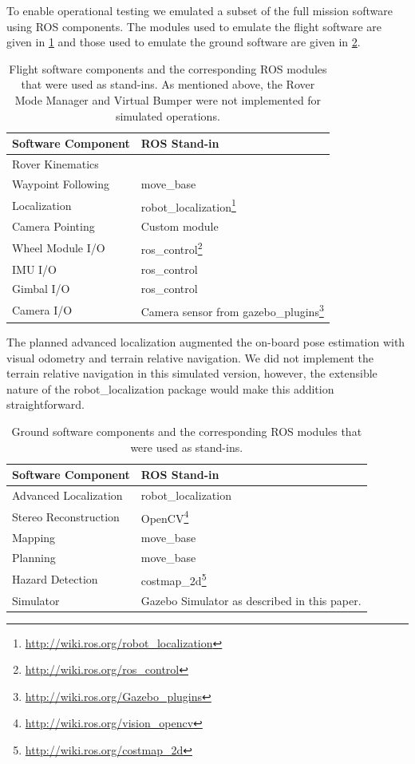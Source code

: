\documentclass[twocolumn,letterpaper]{IEEEAerospaceCLS}  %
\begin{document}

To enable operational testing we emulated a subset of the full mission software using ROS components. The modules used to emulate the flight software are given in \cref{tbl:flight-software-components} and those used to emulate the ground software are given in \cref{tbl:ground-software-components}.

\begin{table}[htp]
\caption{Flight software components and the corresponding ROS modules that were used as stand-ins.  
As mentioned above, the Rover Mode Manager and Virtual Bumper were not implemented for simulated operations.\label{tbl:flight-software-components}}
\begin{tabular}{l|p{4cm}}
\textbf{Software Component} & \textbf{ROS Stand-in} \\
\hline
Rover Kinematics &  \\
Waypoint Following & move\_base \\
Localization & robot\_localization\footnote{\url{http://wiki.ros.org/robot_localization}}\\
Camera Pointing & Custom module \\
Wheel Module I/O & ros\_control\footnote{\url{http://wiki.ros.org/ros_control}}\\
IMU I/O & ros\_control\\
Gimbal I/O & ros\_control\\
Camera I/O & Camera sensor from gazebo\_plugins\footnote{\url{http://wiki.ros.org/Gazebo_plugins}}\\
\hline
\end{tabular}
\end{table}

The planned advanced localization augmented the on-board pose estimation with visual odometry and terrain relative navigation.  We did not implement the terrain relative navigation in this simulated version, however, the extensible nature of the robot\_localization package would make this addition straightforward. 

\begin{table}[htp]
\caption{Ground software components and the corresponding ROS modules that were used as stand-ins.\label{tbl:ground-software-components}}
\begin{tabular}{l|p{4cm}}
\textbf{Software Component} & \textbf{ROS Stand-in} \\
\hline 
Advanced Localization & robot\_localization\\
Stereo Reconstruction & OpenCV\footnote{\url{http://wiki.ros.org/vision_opencv}}\\
Mapping & move\_base\\
Planning & move\_base\\
Hazard Detection & costmap\_2d\footnote{\url{http://wiki.ros.org/costmap_2d}}\\
Simulator & Gazebo Simulator as described in this paper.\\
\hline
\end{tabular}
\end{table}
\end{document}
